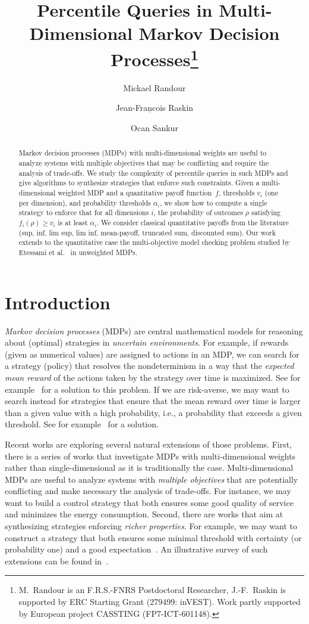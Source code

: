 \documentclass{llncs}
\title{Percentile Queries in Multi-Dimensional Markov Decision Processes\thanks{M.~Randour is an F.R.S.-FNRS Postdoctoral Researcher, J.-F.~Raskin is supported by ERC Starting Grant (279499: inVEST). Work partly supported by European project CASSTING (FP7-ICT-601148).}}
\author{Mickael Randour\inst{1} \and Jean-Fran\c{}cois Raskin\inst{1} \and Ocan Sankur\inst{2}}
\institute{
D\'epartement d'Informatique, Universit\'e libre de Bruxelles (ULB), Belgium
\and CNRS, Irisa, Rennes, France
}
\begin{document}
\maketitle

\begin{abstract}
Markov decision processes (MDPs) with multi-dimensional weights are useful to analyze systems with multiple objectives that may be conflicting and 
require the analysis of trade-offs. We study the complexity of percentile queries in such MDPs and give algorithms to synthesize strategies that enforce such constraints. 
Given a multi-dimensional weighted MDP and a quantitative payoff function~$f$, thresholds $v_i$ (one per dimension), and probability thresholds $\alpha_i$, 
we show how to compute a single strategy to enforce that for all dimensions $i$, the probability of outcomes $\rho$ satisfying $f_i(\rho) \geq v_i$ is at least $\alpha_i$. 
We consider classical quantitative payoffs from the literature (sup, inf, lim sup, lim inf, mean-payoff, truncated sum, discounted sum).  
Our work extends to the quantitative case  the multi-objective model checking problem studied by Etessami et al.~\cite{EKVY-lmcs08} in unweighted MDPs.
\end{abstract}

\section{Introduction}

{\em Markov decision processes} (MDPs) are central mathematical models for reasoning about (optimal) strategies in {\em uncertain environments}. For example, if rewards (given as numerical values) are assigned to actions in an MDP, we can search for a strategy (policy) that resolves the nondeterminism in a way that the {\em expected mean reward} of the actions taken by the strategy over time is maximized. See for example~\cite{Puterman-wiley94} for a solution to this problem. If we are risk-averse, we may want to search instead for strategies that ensure that the mean reward over time is larger than a given value with a high probability, i.e., a probability that exceeds a given threshold. See for example~\cite{FKR-ieee95} for a solution.

Recent works are exploring several natural extensions of those problems.
First, there is a series of works that investigate MDPs with multi-dimensional
weights~\cite{CMH-stacs06,BBCFK-lmcs14} rather than single-dimensional as it is
traditionally the case. Multi-dimensional MDPs are useful to analyze systems
with {\em multiple objectives} that are potentially conflicting and make
necessary the analysis of trade-offs. For instance, we may want to build a
control strategy that both ensures some good quality of service and minimizes the energy consumption. Second, there are works
that aim at synthesizing strategies enforcing {\em richer properties}. For
example, we may want to construct a strategy that both ensures some minimal
threshold with certainty (or probability one) and a good expectation~\cite{DBLP:conf/stacs/BruyereFRR14}. An illustrative survey of such extensions can be found in~\cite{DBLP:conf/vmcai/RandourRS15}.
 
\end{document}
